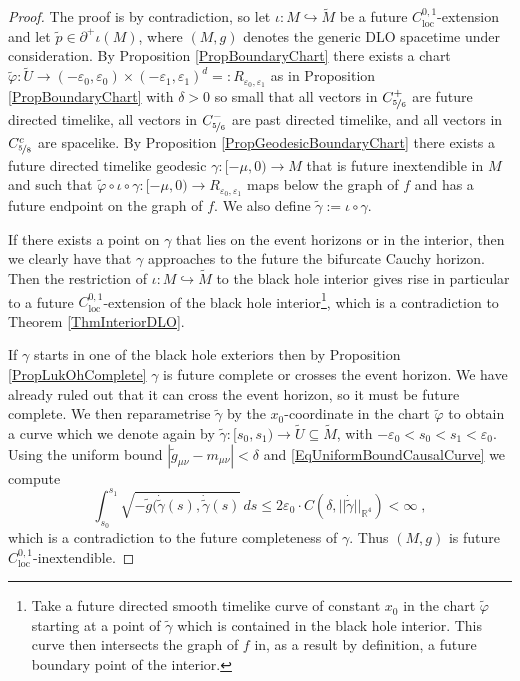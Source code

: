 \documentclass[reqno]{article}
\newcommand{\R}{\mathbb{R}}
\newcommand{\loc}{\mathrm{loc}}
\newcommand{\Reps}{R_{\varepsilon_0, \varepsilon_1}}
\begin{document}
\begin{proof}
The proof  is by contradiction, so let $\iota : M \hookrightarrow \tilde{M}$ be a future $C^{0,1}_{\loc}$-extension and let $\tilde{p} \in \partial^+ \iota (M)$, where $(M,g)$ denotes the generic DLO spacetime under consideration. By Proposition \ref{PropBoundaryChart} there exists a chart $\tilde{\varphi} : \tilde{U} \to(-\varepsilon_0, \varepsilon_0) \times  (-\varepsilon_1, \varepsilon_1)^{d} =: R_{\varepsilon_0, \varepsilon_1}$ as in Proposition \ref{PropBoundaryChart} with $\delta >0$ so small that all vectors in $C^+_{\nicefrac{5}{6}}$ are future directed timelike, all vectors in $C^-_{\nicefrac{5}{6}}$ are past directed timelike, and all vectors in $C^c_{\nicefrac{5}{8}}$ are spacelike. By Proposition \ref{PropGeodesicBoundaryChart} there exists a future directed timelike  geodesic $\gamma : [-\mu,0) \to M$ that is future inextendible in $M$ and such that $\tilde{\varphi} \circ \iota \circ \gamma :[-\mu,0) \to \Reps$ maps below the graph of $f$ and has a future endpoint on the graph of $f$. We also define $\tilde{\gamma} := \iota \circ \gamma$. 

If there exists a point on $\gamma$ that lies on the event horizons or in the interior, then we clearly have that $\gamma$ approaches to the future the bifurcate Cauchy horizon. Then the restriction of $\iota : M \hookrightarrow \tilde{M}$ to the black hole interior gives rise in particular to a future $C^{0,1}_{\loc}$-extension of the black hole interior\footnote{Take a future directed smooth timelike curve of constant $x_0$ in the chart $\tilde{\varphi}$ starting at a point of $\tilde{\gamma}$ which is contained in the black hole interior. This curve then intersects the graph of $f$ in, as a result by definition, a future boundary point of the interior.}, which is a contradiction to Theorem \ref{ThmInteriorDLO}.

If $\gamma$ starts in one of the black hole exteriors then by Proposition \ref{PropLukOhComplete} $\gamma$ is future complete or crosses the event horizon. We have already ruled out that it can cross the event horizon, so  it must be future complete. We then reparametrise $\tilde{\gamma}$ by the $x_0$-coordinate in the chart $\tilde{\varphi}$ to obtain a curve which we denote again by $\tilde{\gamma} : [s_0, s_1) \to \tilde{U} \subseteq \tilde{M}$, with $-\varepsilon_0 < s_0 < s_1 < \varepsilon_0$. Using the uniform bound $|\tilde{g}_{\mu \nu} - m_{\mu \nu}| < \delta$ and \eqref{EqUniformBoundCausalCurve} we compute $$\int_{s_0}^{s_1} \sqrt{- \tilde{g}(\dot{\tilde{\gamma}}(s), \dot{\tilde{\gamma}}(s)} \, ds \leq 2 \varepsilon_0 \cdot C(\delta, ||\dot{\tilde{\gamma}}||_{\R^{4}}) < \infty\;,$$
which is a contradiction to the future completeness of $\gamma$. Thus $(M,g)$ is future $C^{0,1}_{\loc}$-inextendible.
\end{proof}
\end{document}
